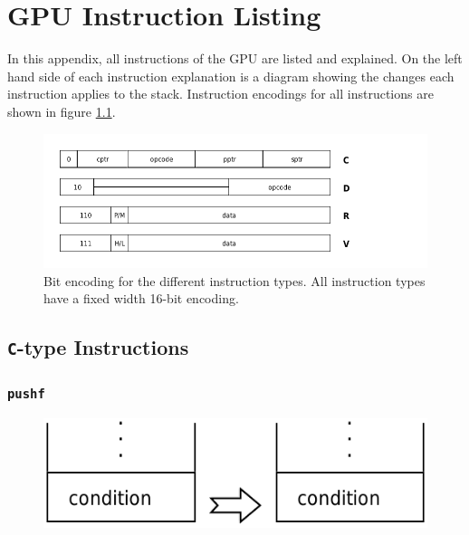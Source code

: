 \chapter{GPU Instruction Listing}

	In this appendix, all instructions of the GPU are listed and explained. On
	the left hand side of each instruction explanation is a diagram showing the
	changes each instruction applies to the stack. Instruction encodings for
	all instructions are shown in figure \ref{encodingfiga}.

	\begin{figure}[H]
		\centering
		\caption{Bit encoding for the different instruction types. All
			instruction types have a fixed width 16-bit encoding.}
		\label{encodingfiga}
		\includegraphics[width=0.75\linewidth]{figure/pdf/instruction_layout} 
	\end{figure}


\newpage

\section{\texttt{C}-type Instructions}
	
	
	\subsection*{\texttt{pushf}}
	
		\begin{figure}
			\begin{flushright}
				\includegraphics[width=\linewidth]{figure/pdf/i_pushf} 
			\end{flushright}
			\vspace{120pt}
		\end{figure}
	
